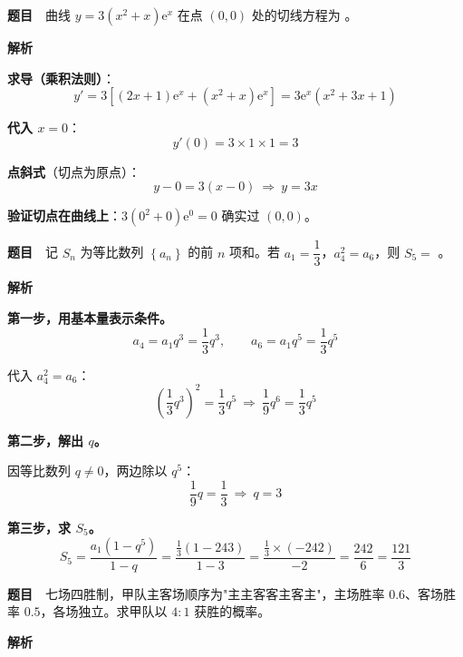 \par\medskip



\textbf{题目}　曲线 $y=3\left(x^{2}+x\right)\mathrm e^{x}$ 在点 $(0,0)$ 处的切线方程为 \gkblank{}。

\textbf{解析}

\textbf{求导（乘积法则）}：
\[y'=3\left[(2x+1)\mathrm e^{x}+\left(x^{2}+x\right)\mathrm e^{x}\right]=3\mathrm e^{x}\left(x^{2}+3x+1\right)\]

\textbf{代入 $x=0$}：
\[y'(0)=3\times1\times1=3\]

\textbf{点斜式}（切点为原点）：
\[y-0=3(x-0)\ \Longrightarrow\ y=3x\]


\begin{gktip}
\textbf{验证切点在曲线上}：$3\left(0^{2}+0\right)\mathrm e^{0}=0$  确实过 $(0,0)$。
\end{gktip}

\par\medskip


\textbf{题目}　记 $S_n$ 为等比数列 $\left\{a_n\right\}$ 的前 $n$ 项和。若 $a_1=\dfrac13$，$a_4^{2}=a_6$，则 $S_5=$ \gkblank{}。

\textbf{解析}

\textbf{第一步，用基本量表示条件。}
\[a_4=a_1q^{3}=\frac13q^{3},\qquad a_6=a_1q^{5}=\frac13q^{5}\]

代入 $a_4^{2}=a_6$：
\[\left(\frac13q^{3}\right)^{2}=\frac13q^{5}\ \Longrightarrow\ \frac19q^{6}=\frac13q^{5}\]

\textbf{第二步，解出 $q$。}

因等比数列 $q\ne0$，两边除以 $q^{5}$：
\[\frac19q=\frac13\ \Longrightarrow\ q=3\]

\textbf{第三步，求 $S_5$。}
\[S_5=\frac{a_1\left(1-q^{5}\right)}{1-q}=\frac{\frac13\left(1-243\right)}{1-3}=\frac{\frac13\times(-242)}{-2}=\frac{242}6=\frac{121}3\]


\par\medskip


\textbf{题目}　七场四胜制，甲队主客场顺序为"主主客客主客主"，主场胜率 $0.6$、客场胜率 $0.5$，各场独立。求甲队以 $4:1$ 获胜的概率。

\textbf{解析}

